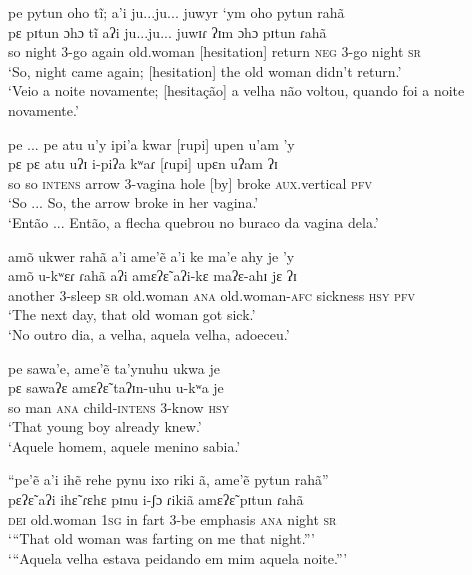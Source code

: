 \documentclass[output=paper,
modfonts,nonflat
]{langsci/langscibook}
\begin{document}
\ea pe pytun oho tĩ; a'i ju...ju... juwyr ‘ym oho pytun rahã \\[.3em]
\gll pɛ pɪtun ɔhɔ tĩ aʔi ju...ju... juwɪɾ ʔɪm ɔhɔ pɪtun ɾahã \\
so night 3-go again old.woman [hesitation] return \textsc{neg} 3-go night \textsc{sr} \\
\glt ‘So, night came again; [hesitation] the old woman didn’t return.’ \\
‘Veio a noite novamente; [hesitação] a velha não voltou, quando foi a noite novamente.’ \\
\z

\ea pe ... pe atu u'y ipi'a kwar [rupi]\footnotemark{} upen u'am 'y \\[.3em]
\gll pɛ pɛ atu uʔɪ i-piʔa kʷaɾ [ɾupi] upɛn uʔam ʔɪ \\
so so \textsc{intens} arrow 3-vagina hole [by] broke \textsc{aux}.vertical \textsc{pfv} \\
\glt ‘So ... So, the arrow broke in her vagina.’ \\
‘Então ... Então, a flecha quebrou no buraco da vagina dela.’ \\
\z

\ea amõ ukwer rahã a'i ame'ẽ a'i ke ma'e ahy je 'y \\[.3em]
\gll amõ u-kʷɛɾ ɾahã aʔi amɛʔɛ̃ aʔi-kɛ maʔɛ-ahɪ jɛ ʔɪ \\
another 3-sleep \textsc{sr} old.woman \textsc{ana} old.woman-\textsc{afc} sickness \textsc{hsy} \textsc{pfv} \\
\glt ‘The next day, that old woman got sick.’ \\
‘No outro dia, a velha, aquela velha, adoeceu.’ \\
\z

\ea pe sawa'e, ame'ẽ ta'ynuhu ukwa je  \\[.3em]
\gll pɛ sawaʔɛ amɛʔɛ̃ taʔɪn-uhu u-kʷa je \\ so man \textsc{ana} child-\textsc{intens} 3-know \textsc{hsy} \\
\glt ‘That young boy already knew.’ \\
‘Aquele homem, aquele menino sabia.’ \\
\z

\ea “pe'ẽ a'i ihẽ rehe pynu ixo riki ã, ame'ẽ pytun rahã”  \\[.3em]
\gll pɛʔɛ̃ aʔi ihɛ̃ ɾɛhɛ pɪnu i-ʃɔ ɾikiã amɛʔɛ̃ pɪtun ɾahã \\
\textsc{dei} old.woman \textsc{1sg} in fart 3-be emphasis \textsc{ana} night \textsc{sr} \\
\glt ‘“That old woman was farting on me that night.”’ \\
‘“Aquela velha estava peidando em mim aquela noite.”’ \\
\z
\end{document}
